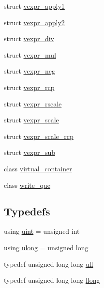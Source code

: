 \begin{DoxyCompactItemize}
\item 
struct \hyperlink{structmui_1_1vexpr__apply1}{vexpr\+\_\+apply1}
\item 
struct \hyperlink{structmui_1_1vexpr__apply2}{vexpr\+\_\+apply2}
\item 
struct \hyperlink{structmui_1_1vexpr__div}{vexpr\+\_\+div}
\item 
struct \hyperlink{structmui_1_1vexpr__mul}{vexpr\+\_\+mul}
\item 
struct \hyperlink{structmui_1_1vexpr__neg}{vexpr\+\_\+neg}
\item 
struct \hyperlink{structmui_1_1vexpr__rcp}{vexpr\+\_\+rcp}
\item 
struct \hyperlink{structmui_1_1vexpr__rscale}{vexpr\+\_\+rscale}
\item 
struct \hyperlink{structmui_1_1vexpr__scale}{vexpr\+\_\+scale}
\item 
struct \hyperlink{structmui_1_1vexpr__scale__rcp}{vexpr\+\_\+scale\+\_\+rcp}
\item 
struct \hyperlink{structmui_1_1vexpr__sub}{vexpr\+\_\+sub}
\item 
class \hyperlink{classmui_1_1virtual__container}{virtual\+\_\+container}
\item 
class \hyperlink{classmui_1_1write__que}{write\+\_\+que}
\end{DoxyCompactItemize}
\subsection*{Typedefs}
\begin{DoxyCompactItemize}
\item 
using \hyperlink{namespacemui_af15a3e7188a2117fb9965277bb0cacd2}{uint} = unsigned int
\item 
using \hyperlink{namespacemui_a9547f17257ee9191f5ca66284f9ca8ab}{ulong} = unsigned long
\item 
typedef unsigned long long \hyperlink{namespacemui_ad0c8bc9723291f37096fd61fcb905115}{ull}
\item 
typedef unsigned long long \hyperlink{namespacemui_acdd7d9ab9b53650d3c9faa4aa3320d7f}{llong}
\end{DoxyCompactItemize}

